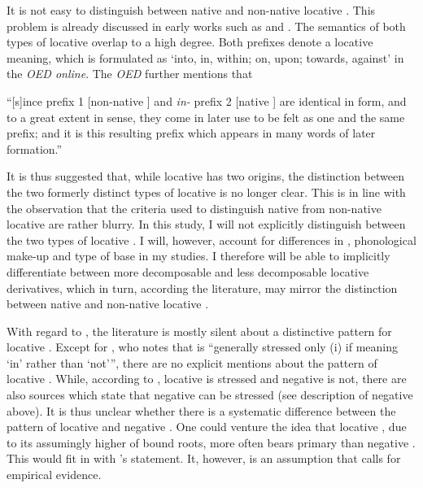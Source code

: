 It is not easy to distinguish between native and non-native locative . This problem is  already discussed in early works such as \citet[499]{Jespersen.1965} and \citet[164]{Marchand.1969}. The semantics of both types of locative  overlap to a high degree. Both prefixes denote a locative meaning, which is formulated as ‘into, in, within; on, upon; towards, against’ in the \textit{OED online}\nocite{OED.2013}. The \textit{OED} further mentions that 

\begin{displayquote}
``[s]ince  prefix 1 [non-native ] and \textit{ in-} prefix 2 [native ] are identical in form, and to a great extent in sense, they come in later use to be felt as one and the same prefix; and it is this resulting prefix which appears in many words of later formation.''
\end{displayquote}

It is thus suggested that, while locative  has two origins, the distinction between the two formerly distinct types of locative  is no longer clear. This is in line with the observation that the criteria used to distinguish native from non-native locative  are rather blurry. 
In this study, I will not explicitly distinguish between the two types of locative . I will, however, account for differences in , phonological make-up and type of base in my studies. I therefore will be able to implicitly differentiate between more decomposable and less decomposable locative derivatives, which in turn, according the literature, may mirror the distinction between native and non-native locative .

With regard to , the literature is mostly silent about a distinctive  pattern for locative . Except for \citet[384]{Wells.2008}, who notes that  is ``generally stressed only
(i) if meaning `in' rather than `not''', there are no explicit mentions about the  pattern of locative . While, according to \cite{Wells.2008}, locative  is stressed and negative  is not, there are also sources which state that negative  can be stressed (see description of negative  above). It is thus unclear whether there is a systematic difference between the  pattern of locative and negative . One could venture the idea that locative , due to its assumingly higher  of bound roots, more often bears primary  than negative . This would fit in with \citeauthor{Wells.2008}'s statement. It, however, is an assumption that calls for empirical evidence.

